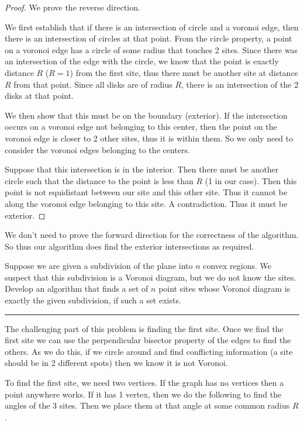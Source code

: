 \documentclass[11pt]{article}
\begin{document}
\begin{proof}
    We prove the reverse direction. 

    We first establish that if there is an intersection of circle and a voronoi edge,
    then there is an intersection of circles at that point. From the circle property,
    a point on a voronoi edge has a circle of some radius that touches 2 sites.
    Since there was an intersection of the edge with the circle, we know that the point is 
    exactly distance $R$ ($R=1$) from the first site, thus there must be another site at distance $R$
    from that point. Since all disks are of radius $R$, there is an intersection of the 2 disks at that point.

    We then show that this must be on the boundary (exterior). If the intersection occurs on a voronoi
    edge not belonging to this center, then the point on the voronoi edge is closer to 2 other sites,
    thus it is within them. So we only need to consider the voronoi edges belonging to the centers.

    Suppose that this intersection is in the interior. Then there must be another circle such that 
    the distance to the point is less than $R$ (1 in our case). 
    Then this point is not equidistant between our site and this other site. Thus it cannot be along the
    voronoi edge belonging to this site. A contradiction. Thus it must be exterior.
\end{proof}

We don't need to prove the forward direction for the correctness of the algorithm. 
So thus our algorithm does find the exterior intersections as required. 





Suppose we are given a subdivision of the plane into $n$ convex regions. We
suspect that this subdivision is a Voronoi diagram, but we do not know the
sites. Develop an algorithm that finds a set of $n$ point sites whose Voronoi
diagram is exactly the given subdivision, if such a set exists.
\hrule

The challenging part of this problem is finding the first site.
Once we find the first site we can use the perpendicular bisector property of the edges to find the others.
As we do this, if we circle around and find conflicting information (a site should be in 2 different spots)
then we know it is not Voronoi. 

To find the first site, we need two vertices. If the graph has no vertices then a point anywhere works.
If it has 1 vertex, then we do the following to find the angles of the 3 sites. Then we place them 
at that angle at some common radius $R$.
\end{document}
